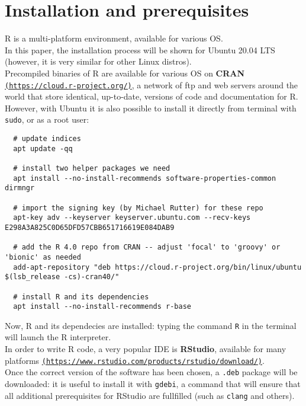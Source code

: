 \documentclass{article}
\begin{document}
\pagebreak

\section{Installation and prerequisites}
R is a multi-platform environment, available for various OS.\\
In this paper, the installation process will be shown for Ubuntu 20.04 LTS\\
(however, it is very similar for other Linux distros).\\

Precompiled binaries of R are available for various OS on \textbf{CRAN} \href{https://cloud.r-project.org/}{\texttt{(https://cloud.r-project.org/)}}, a network of ftp and web servers around the world that store identical, up-to-date, versions of code and documentation for R.\\

However, with Ubuntu it is also possible to install it directly from terminal with \texttt{sudo}, or as a root user:\\

\begin{lstlisting}
  # update indices
  apt update -qq

  # install two helper packages we need
  apt install --no-install-recommends software-properties-common dirmngr

  # import the signing key (by Michael Rutter) for these repo
  apt-key adv --keyserver keyserver.ubuntu.com --recv-keys E298A3A825C0D65DFD57CBB651716619E084DAB9

  # add the R 4.0 repo from CRAN -- adjust 'focal' to 'groovy' or 'bionic' as needed
  add-apt-repository "deb https://cloud.r-project.org/bin/linux/ubuntu $(lsb_release -cs)-cran40/"

  # install R and its dependencies
  apt install --no-install-recommends r-base
\end{lstlisting}

Now, R and its dependecies are installed: typing the command \texttt{R} in the terminal will launch the R interpreter.\\

In order to write R code, a very popular IDE is \textbf{RStudio}, available for many platforms \href{https://www.rstudio.com/products/rstudio/download/}{\texttt{(https://www.rstudio.com/products/rstudio/download/)}}.
\\

Once the correct version of the software has been chosen, a \texttt{.deb} package will be downloaded: it is useful to install it with \texttt{gdebi}, a command that will ensure that all additional prerequisites for RStudio are fullfilled (such as \texttt{clang} and others).\\
\end{document}
